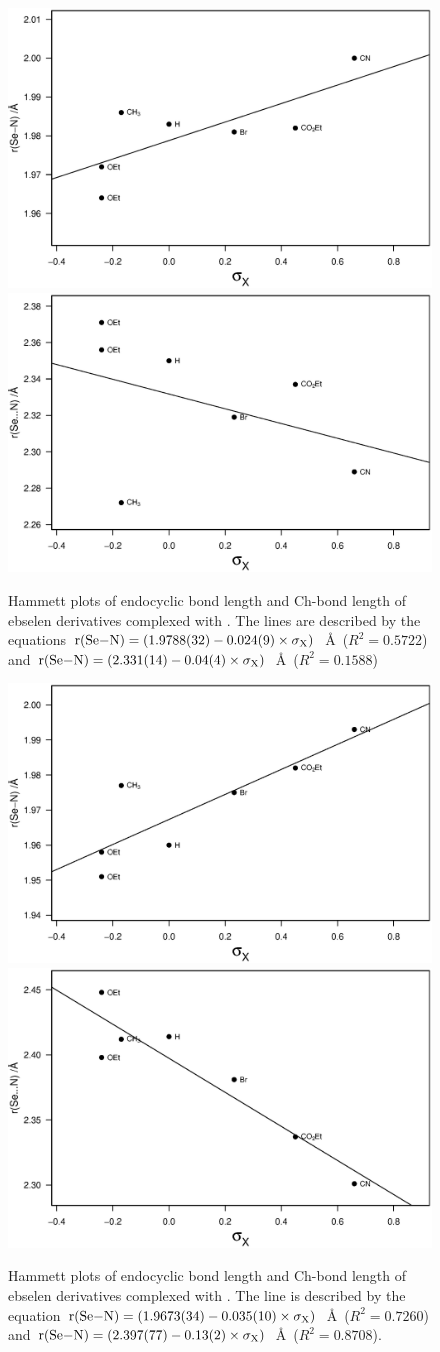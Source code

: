\begin{figure}
    \centering
    \includegraphics[width=0.48\linewidth]{Figures/hammett-endo-pyrrol.eps}
    \includegraphics[width=0.48\linewidth]{Figures/hammett-pyrrol.eps}
    \caption{Hammett plots of endocyclic  bond length and  Ch-bond length of ebselen derivatives complexed with . The lines are described by the equations $\mathrm{r}(\ce{Se-N}) = (1.9788(32) - 0.024(9) \times \sigma_{\mathrm{X}})$~\AA~($R^2=0.5722$) and $\mathrm{r}(\ce{Se-N}) = (2.331(14) - 0.04(4) \times \sigma_{\mathrm{X}})$~\AA~($R^2=0.1588$)}
    \label{fig:hammett-pyrrol}
\end{figure}

\begin{figure}
    \centering
    \includegraphics[width=0.48\linewidth]{Figures/hammett-endo-morph.eps}
    \includegraphics[width=0.48\linewidth]{Figures/hammett-morph.eps}
    \caption{Hammett plots of endocyclic  bond length and  Ch-bond length of ebselen derivatives complexed with . The line is described by the equation $\mathrm{r}(\ce{Se-N}) = (1.9673(34) - 0.035(10) \times \sigma_{\mathrm{X}})$~\AA~($R^2=0.7260$) and $\mathrm{r}(\ce{Se-N}) = (2.397(77) - 0.13(2) \times \sigma_{\mathrm{X}})$~\AA~($R^2=0.8708$).}
    \label{fig:hammett-morph}
\end{figure}

